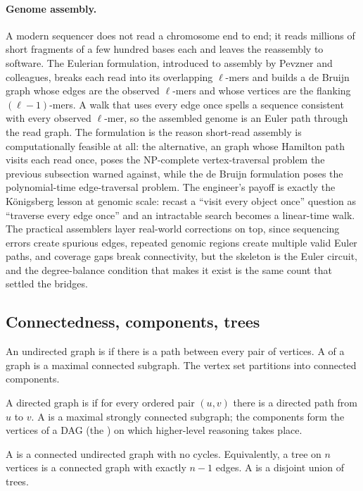 \paragraph{Genome assembly.}
A modern sequencer does not read a chromosome end to end; it reads
millions of short fragments of a few hundred bases each and leaves
the reassembly to software. The Eulerian formulation, introduced to
assembly by Pevzner and colleagues, breaks each read into its
overlapping $\ell$-mers and builds a de Bruijn graph whose edges are
the observed $\ell$-mers and whose vertices are the flanking
$(\ell - 1)$-mers. A walk that uses every edge once spells a sequence
consistent with every observed $\ell$-mer, so the assembled genome is
an Euler path through the read graph. The formulation is the reason
short-read assembly is computationally feasible at all: the
alternative, an  graph whose Hamilton path visits
each read once, poses the NP-complete vertex-traversal problem the
previous subsection warned against, while the de Bruijn formulation
poses the polynomial-time edge-traversal problem. The engineer's
payoff is exactly the K\"{o}nigsberg lesson at genomic scale: recast
a ``visit every object once'' question as ``traverse every edge
once'' and an intractable search becomes a linear-time walk. The
practical assemblers layer real-world corrections on top, since
sequencing errors create spurious edges, repeated genomic regions
create multiple valid Euler paths, and coverage gaps break
connectivity, but the skeleton is the Euler circuit, and the
degree-balance condition that makes it exist is the same count that
settled the bridges.

\subsection{Connectedness, components, trees}

An undirected graph is  if there is a path
between every pair of vertices. A  of
a graph is a maximal connected subgraph. The vertex set partitions
into connected components.

A directed graph is  if for every
ordered pair $(u, v)$ there is a directed path from $u$ to $v$. A
 is a maximal strongly
connected subgraph; the components form the vertices of a DAG (the
) on which higher-level reasoning takes
place.

\begin{definition}[Tree]
A  is a connected undirected graph with no cycles.
Equivalently, a tree on $n$ vertices is a connected graph with
exactly $n - 1$ edges. A  is a disjoint union of
trees.
\end{definition}

